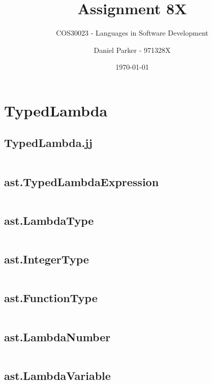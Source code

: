 \documentclass[11pt, numbers=endperiod, parskip=half]{scrartcl}
\title{Assignment 8X}
\subtitle{COS30023 - Languages in Software Development}
\author{Daniel Parker - 971328X}
\date{\today}
\begin{document}

\maketitle
\section{TypedLambda}
\subsection{TypedLambda.jj}
\inputminted[tabsize=2]{java}{LambdaTypeSystem/src/TypedLambda.jj}

\subsection{ast.TypedLambdaExpression}
\inputminted[tabsize=2]{java}{LambdaTypeSystem/src/ast/TypedLambdaExpression.java}

\subsection{ast.LambdaType}
\inputminted[tabsize=2]{java}{LambdaTypeSystem/src/ast/LambdaType.java}

\subsection{ast.IntegerType}
\inputminted[tabsize=2]{java}{LambdaTypeSystem/src/ast/IntegerType.java}

\subsection{ast.FunctionType}
\inputminted[tabsize=2]{java}{LambdaTypeSystem/src/ast/FunctionType.java}

\subsection{ast.LambdaNumber}
\inputminted[tabsize=2]{java}{LambdaTypeSystem/src/ast/LambdaNumber.java}

\subsection{ast.LambdaVariable}
\inputminted[tabsize=2]{java}{LambdaTypeSystem/src/ast/LambdaVariable.java}
\end{document}

